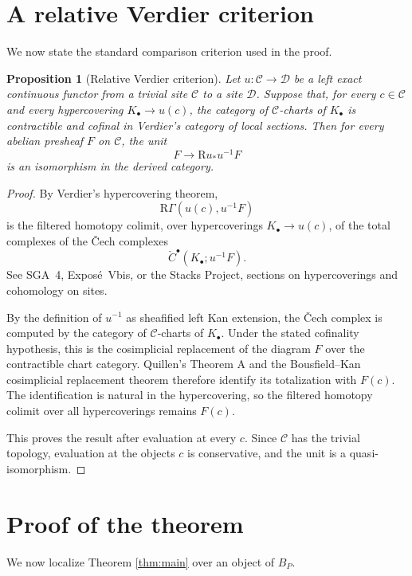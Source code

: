 \documentclass{article}
\newtheorem{proposition}[theorem]{Proposition}
\theoremstyle{definition}
\theoremstyle{remark}
\newcommand{\R}{\mathrm{R}}
\begin{document}
\section{A relative Verdier criterion}

We now state the standard comparison criterion used in the proof.

\begin{proposition}[Relative Verdier criterion]\label{prop:verdier}
Let \(u:\mathcal C\to\mathcal D\) be a left exact continuous functor from a trivial site \(\mathcal C\) to a site \(\mathcal D\).  Suppose that, for every \(c\in\mathcal C\) and every hypercovering \(K_\bullet\to u(c)\), the category of \(\mathcal C\)-charts of \(K_\bullet\) is contractible and cofinal in Verdier's category of local sections.  Then for every abelian presheaf \(F\) on \(\mathcal C\), the unit
\[
F\longrightarrow \R u_*u^{-1}F
\]
is an isomorphism in the derived category.
\end{proposition}

\begin{proof}
By Verdier's hypercovering theorem,
\[
\R\Gamma(u(c),u^{-1}F)
\]
is the filtered homotopy colimit, over hypercoverings \(K_\bullet\to u(c)\), of the total complexes of the Čech complexes
\[
\check C^\bullet(K_\bullet;u^{-1}F).
\]
See SGA~4, Expos\'e~Vbis, or the Stacks Project, sections on hypercoverings and cohomology on sites.

By the definition of \(u^{-1}\) as sheafified left Kan extension, the Čech complex is computed by the category of \(\mathcal C\)-charts of \(K_\bullet\).  Under the stated cofinality hypothesis, this is the cosimplicial replacement of the diagram \(F\) over the contractible chart category.  Quillen's Theorem A and the Bousfield--Kan cosimplicial replacement theorem therefore identify its totalization with \(F(c)\).  The identification is natural in the hypercovering, so the filtered homotopy colimit over all hypercoverings remains \(F(c)\).

This proves the result after evaluation at every \(c\).  Since \(\mathcal C\) has the trivial topology, evaluation at the objects \(c\) is conservative, and the unit is a quasi-isomorphism.
\end{proof}

\section{Proof of the theorem}

We now localize Theorem \ref{thm:main} over an object of \(B_P\).
\end{document}
